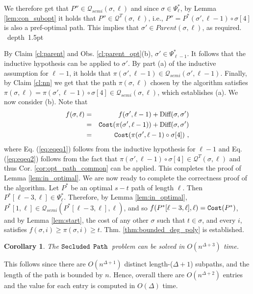 \documentclass[12pt]{article}
\newtheorem{corollary}[theorem]{Corollary}
\def\Cost{\mbox{\tt Cost}}
\def\blackslug{\hbox{\hskip 1pt \vrule width 4pt height 8pt
    depth 1.5pt \hskip 1pt}}
\def\QED{\quad\blackslug\lower 8.5pt\null\par}
\newcommand{\MAXDEG}[0]{\Delta}
\newcommand{\DIFF}[0]{\mbox{Diff}}
\newcommand{\PP}[0]{$\mbox{\tt Secluded}$ $\mbox{\tt Path}$}
\newcommand{\DegThreeConst}[0]{4}
\def\Cost{\mbox{\tt Cost}}
\begin{document}
\par We therefore get that $P'' \in \mathcal{Q}_{semi}(\sigma,\ell)$ and since $\sigma \in \Psi^{*}_{\ell}$, by Lemma \ref{lem:con_subopt} it holds that $P''\in \mathcal{Q}^{T}(\sigma,\ell)$, i.e., $P''=P^{*}(\sigma',\ell-1) \circ \sigma[\DegThreeConst]$ is also a pref-optimal path. This implies that $\sigma' \in Parent(\sigma,\ell)$, as required.
\QED
By Claim \ref{cl:parent} and Obs. \ref{cl:parent_opt}(b), $\sigma' \in \Psi^{*}_{\ell-1}$. It follows that the inductive hypothesis can be applied to $\sigma'$. By part (a) of the inductive assumption for $\ell-1$, it holds that $\pi(\sigma',\ell-1) \in \mathcal{Q}_{semi}(\sigma',\ell-1)$. Finally, by Claim \ref{cl:nn} we get that the path $\pi(\sigma,\ell)$ chosen by the algorithm satisfies $\pi(\sigma,\ell)=\pi(\sigma',\ell-1)\circ \sigma[\DegThreeConst] \in \mathcal{Q}_{semi}(\sigma,\ell)$, which establishes (a).
We now consider (b). Note that
\begin{eqnarray}
f(\sigma,\ell)&=&f(\sigma',\ell-1)+\DIFF(\sigma,\sigma') \nonumber
\\&=&
\Cost(\pi(\sigma',\ell-1))+\DIFF(\sigma,\sigma') \label{eq:eqeq1}
\\&=&
\Cost(\pi(\sigma',\ell-1) \circ \sigma[\DegThreeConst]) \label{eq:eqeq2}~,
\end{eqnarray}
where Eq. (\ref{eq:eqeq1}) follows from the inductive hypothesis for $\ell-1$ and Eq. (\ref{eq:eqeq2}) follows from the fact that $\pi(\sigma',\ell-1) \circ \sigma[\DegThreeConst] \in \mathcal{Q}^{T}(\sigma,\ell)$ and thus Cor. \ref{cor:opt_path_common} can be applied.
This completes the proof of Lemma \ref{lem:in_optimal}.
We are now ready to complete the correctness proof of the algorithm. Let $P^{*}$ be an optimal $s-t$ path of length $\ell$. Then $P^{*}[\ell-3,\ell] \in \Psi^{*}_{\ell}$. Therefore, by Lemma \ref{lem:in_optimal}, $P^{*}[1,\ell] \in \mathcal{Q}_{semi}(P^{*}[\ell-3,\ell],\ell)$, and so $f(P^{*}[\ell-3,\ell],\ell)=\Cost(P^{*})$, and by Lemma \ref{lem:start}, the cost of any other $\sigma$ such that $t \in \sigma$, and every $i$, satisfies $f(\sigma,i)\geq \pi(\sigma,i) \geq t$.  Thm. \ref{thm:bounded_deg_poly} is established.
\begin{corollary}
\label{cor:deg_pp}
The \PP\ problem can be solved in $O(n^{\MAXDEG+3})$ time.
\end{corollary}
This follows since there are $O(n^{\MAXDEG+1})$ distinct length-($\MAXDEG+1$) subpaths, and the length of the path is bounded by $n$. Hence, overall there are $O(n^{\MAXDEG+2})$ entries and the value for each entry is computed in $O(\MAXDEG)$ time.
\end{document}
